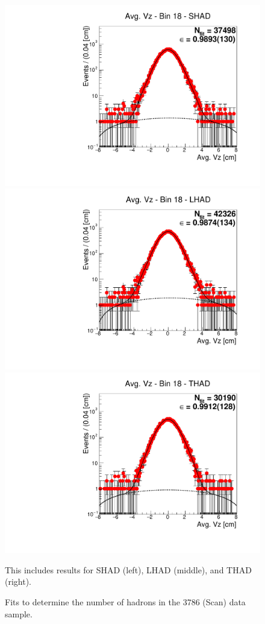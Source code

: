 \begin{figure}[H]
\centering
\includegraphics[scale=0.25]{figures/plots/nonDDbar_fit_results/scan/fit_scan_18_data_SHAD.pdf}
\hspace{-0.5cm}
\includegraphics[scale=0.25]{figures/plots/nonDDbar_fit_results/scan/fit_scan_18_data_LHAD.pdf}
\hspace{-0.5cm}
\includegraphics[scale=0.25]{figures/plots/nonDDbar_fit_results/scan/fit_scan_18_data_THAD.pdf}
\caption{Fits to determine the number of hadrons in the 3786 (Scan) data sample.}
{This includes results for SHAD (left), LHAD (middle), and THAD (right).}
\label{fig:hadron_fits_scan_18}
\end{figure}

